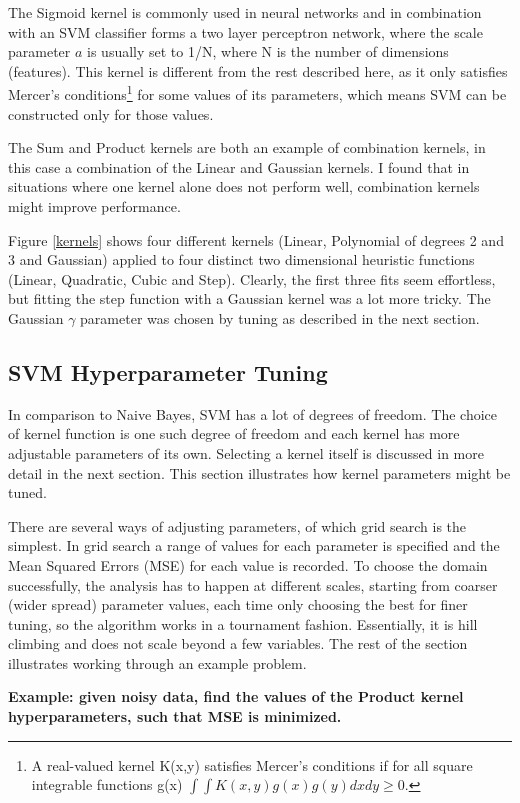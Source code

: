 \documentclass[12pt,a4paper,notitlepage,twoside]{scrbook}
\begin{document}
The Sigmoid kernel is commonly used in neural networks
and in combination with an SVM classifier forms a two layer perceptron network,
where the scale parameter \(a\) is usually set to 1/N, where N is the number of
dimensions (features)\cite{sigmoid}. This kernel is different from the rest described
here, as it only satisfies Mercer's conditions\footnote{A real-valued kernel K(x,y) satisfies
Mercer's conditions if for all square integrable functions g(x) \(\int\int
K(x,y)g(x)g(y)dxdy\geq 0.\)} for some values of its parameters, which
	means SVM can be constructed only for those values\cite{stat_learn}.

The Sum and Product kernels are both an example of combination kernels, in this case a
combination of the Linear and Gaussian kernels. I found that in situations
where one kernel alone does not perform well, combination kernels might improve performance.

Figure \ref{kernels} shows four different kernels (Linear, Polynomial of degrees 2 and 3
and Gaussian) applied to four distinct two dimensional heuristic functions (Linear, Quadratic,
Cubic and Step). Clearly, the first three fits seem effortless, but fitting the step
function with a Gaussian kernel was a lot more tricky. The Gaussian $\gamma$ parameter was chosen
by tuning as described in the next section.
\subsection{SVM Hyperparameter Tuning}
\label{sec:tuning}
In comparison to Naive Bayes, SVM has a lot of degrees of freedom. The choice of kernel function is
one such degree of freedom and each kernel has more adjustable parameters of its own. Selecting a kernel 
itself is discussed in more detail in the next section. This section illustrates how
kernel parameters might be tuned. 

There are several ways of adjusting parameters, of which grid search is the simplest. In
grid search a range of values for each parameter is specified and the Mean Squared Errors
(MSE) for each value is recorded. To choose the domain successfully, the analysis has to
happen at different scales, starting from coarser (wider spread) parameter values, each
time only choosing the best for finer tuning, so the algorithm works in a tournament
fashion. Essentially, it is hill climbing and does not scale beyond a few variables. The
rest of the section illustrates working through an example problem.

\textbf{Example: given noisy data, find the values of the Product kernel
hyperparameters, such that MSE is minimized.}
\end{document}
